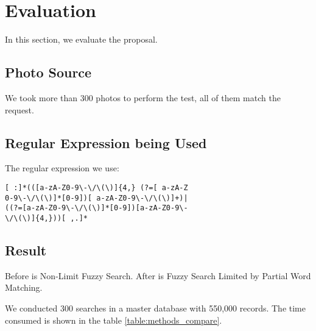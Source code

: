 \documentclass[technicalreport]{ieicej}
\begin{document}
\section{Evaluation}
\label{sec:evaluation}
    In this section, we evaluate the proposal. 

    \subsection{Photo Source}
        We took more than 300 photos to perform the test, all of them match the request.

    \subsection{Regular Expression being Used}
        The regular expression we use:

        \begin{center}
        \begin{BVerbatim}
[ :]*(([a-zA-Z0-9\-\/\(\)]{4,} (?=[ a-zA-Z
0-9\-\/\(\)]*[0-9])[ a-zA-Z0-9\-\/\(\)]+)|
((?=[a-zA-Z0-9\-\/\(\)]*[0-9])[a-zA-Z0-9\-
\/\(\)]{4,}))[ ,.]*
        \end{BVerbatim}
        \end{center}
    
    \subsection{Result}
        Before is Non-Limit Fuzzy Search. After is Fuzzy Search Limited by Partial Word Matching.
    
        We conducted 300 searches in a master database with 550,000 records. The time consumed is shown in the table \ref{table:methods_compare}.
    
\end{document}
